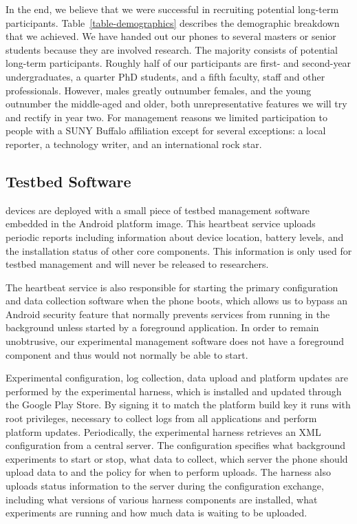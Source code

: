 

In the end, we believe that we were successful in recruiting potential
long-term participants. Table~\ref{table-demographics} describes the
demographic breakdown that we achieved. We have handed out our phones to
several masters or senior students because they are involved \PhoneLab{}
research. The majority consists of potential long-term participants. Roughly
half of our participants are first- and second-year undergraduates, a quarter
PhD students, and a fifth faculty, staff and other professionals. However,
males greatly outnumber females, and the young outnumber the middle-aged and
older, both unrepresentative features we will try and rectify in year two.
For management reasons we limited participation to people with a SUNY Buffalo
affiliation except for several exceptions: a local reporter, a technology
writer, and an international rock star.

\subsection{Testbed Software}

\PhoneLab{} devices are deployed with a small piece of testbed management
software embedded in the Android platform image. This heartbeat service
uploads periodic reports including information about device location, battery
levels, and the installation status of other core \PhoneLab{} components.
This information is only used for testbed management and will never be
released to researchers.

The heartbeat service is also responsible for starting the primary
\PhoneLab{} configuration and data collection software when the phone boots,
which allows us to bypass an Android security feature that normally prevents
services from running in the background unless started by a foreground
application. In order to remain unobtrusive, our experimental management
software does not have a foreground component and thus would not normally be
able to start.

Experimental configuration, log collection, data upload and platform updates
are performed by the \PhoneLab{} experimental harness, which is installed and
updated through the Google Play Store. By signing it to match the platform
build key it runs with root privileges, necessary to collect logs from all
applications and perform platform updates. Periodically, the experimental
harness retrieves an XML configuration from a central \PhoneLab{} server. The
configuration specifies what background experiments to start or stop, what
data to collect, which server the phone should upload data to and the policy
for when to perform uploads. The \PhoneLab{} harness also uploads status
information to the server during the configuration exchange, including what
versions of various harness components are installed, what experiments are
running and how much data is waiting to be uploaded.

